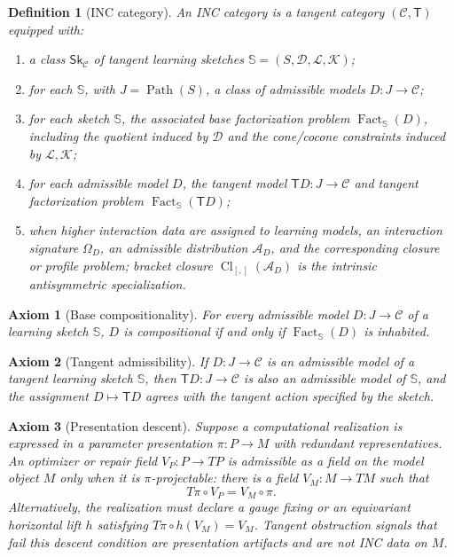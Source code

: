 \documentclass{article}
\newtheorem{definition}{Definition}
\newtheorem{axiom}{Axiom}
\newcommand{\C}{\mathcal{C}}
\newcommand{\T}{\mathsf{T}}
\newcommand{\Fact}{\operatorname{Fact}}
\newcommand{\Path}{\operatorname{Path}}
\newcommand{\Cl}{\operatorname{Cl}}
\begin{document}
\begin{definition}[INC category]
An INC category is a tangent category \((\C,\T)\) equipped with:
\begin{enumerate}[leftmargin=2em]
  \item a class \(\mathsf{Sk}_{\C}\) of tangent learning sketches \(\mathbb S=(S,\mathcal D,\mathcal L,\mathcal K)\);
  \item for each \(\mathbb S\), with \(J=\Path(S)\), a class of admissible models \(D:J\to\C\);
  \item for each sketch \(\mathbb S\), the associated base factorization problem \(\Fact_{\mathbb S}(D)\), including the quotient induced by \(\mathcal D\) and the cone/cocone constraints induced by \(\mathcal L,\mathcal K\);
  \item for each admissible model \(D\), the tangent model \(\T D:J\to\C\) and tangent factorization problem \(\Fact_{\mathbb S}(\T D)\);
  \item when higher interaction data are assigned to learning models, an
  interaction signature $\Omega_D$, an admissible distribution $\mathcal A_D$,
  and the corresponding closure or profile problem; bracket closure
  $\Cl_{[,]}(\mathcal A_D)$ is the intrinsic antisymmetric specialization.
\end{enumerate}
\end{definition}

\begin{axiom}[Base compositionality]
For every admissible model \(D:J\to\C\) of a learning sketch \(\mathbb S\), \(D\) is compositional if and only if \(\Fact_{\mathbb S}(D)\) is inhabited.
\end{axiom}

\begin{axiom}[Tangent admissibility]
If \(D:J\to\C\) is an admissible model of a tangent learning sketch \(\mathbb S\), then \(\T D:J\to\C\) is also an admissible model of \(\mathbb S\), and the assignment \(D\mapsto \T D\) agrees with the tangent action specified by the sketch.
\end{axiom}

\begin{axiom}[Presentation descent]
Suppose a computational realization is expressed in a parameter presentation
$\pi:P\to M$ with redundant representatives.  An optimizer or repair field
$V_P:P\to TP$ is admissible as a field on the model object $M$ only when it is
$\pi$-projectable: there is a field $V_M:M\to TM$ such that
\[
T\pi\circ V_P=V_M\circ\pi.
\]
Alternatively, the realization must declare a gauge fixing or an equivariant
horizontal lift $h$ satisfying $T\pi\circ h(V_M)=V_M$.  Tangent obstruction
signals that fail this descent condition are presentation artifacts and are
not INC data on $M$.
\end{axiom}
\end{document}
